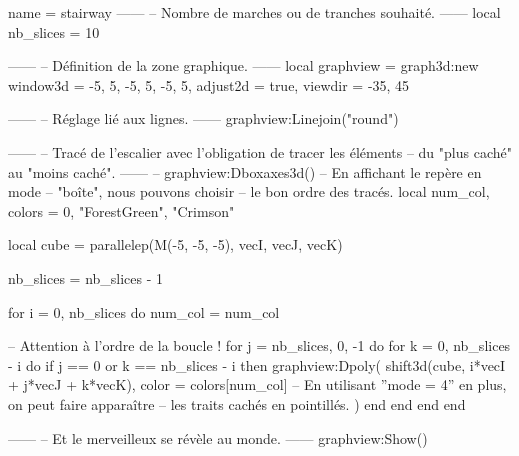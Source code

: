 \documentclass[border = 3pt]{standalone}
\begin{document}
\begin{luadraw}{name = stairway}
------
-- Nombre de marches ou de tranches souhaité.
------
local nb_slices = 10

------
-- Définition de la zone graphique.
------
local graphview = graph3d:new{
  window3d = {-5, 5, -5, 5, -5, 5},
  adjust2d = true,
  viewdir  = {-35, 45}
}

------
-- Réglage lié aux lignes.
------
graphview:Linejoin("round")

------
-- Tracé de l'escalier avec l'obligation de tracer les éléments
-- du "plus caché" au "moins caché".
------
-- graphview:Dboxaxes3d()  -- En affichant le repère en mode
                        -- "boîte", nous pouvons choisir
                        -- le bon ordre des tracés.
local num_col, colors = 0, {"ForestGreen", "Crimson"}

local cube = parallelep(M(-5, -5, -5), vecI, vecJ, vecK)

nb_slices = nb_slices - 1

for i = 0, nb_slices do
  num_col = num_col%

-- Attention à l'ordre de la boucle !
  for j = nb_slices, 0, -1 do
    for k = 0, nb_slices - i do
      if j == 0 or k == nb_slices - i then
        graphview:Dpoly(
          shift3d(cube, i*vecI + j*vecJ + k*vecK),
          {
            color = colors[num_col]
-- En utilisant ''mode = 4'' en plus, on peut faire apparaître
-- les traits cachés en pointillés.
          })
      end
    end
  end
end

------
-- Et le merveilleux se révèle au monde.
------
graphview:Show()
\end{luadraw}
\end{document}

